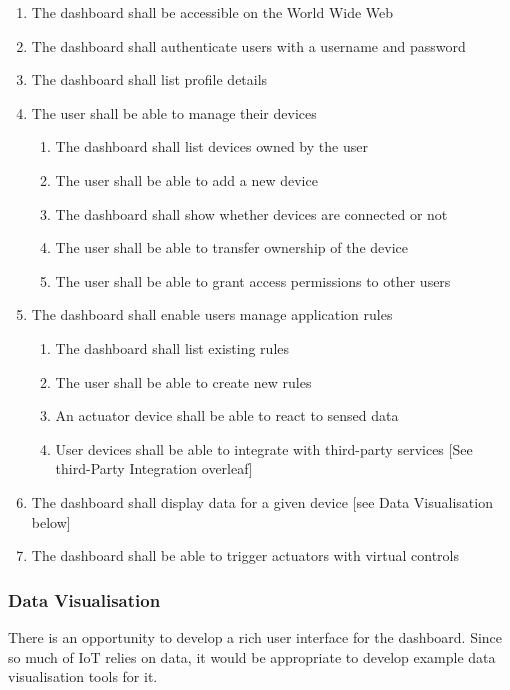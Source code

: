         \begin{enumerate}
          \item The dashboard shall be accessible on the World Wide Web
          \item The dashboard shall authenticate users with a username and password
          \item The dashboard shall list profile details
          \item The user shall be able to manage their devices
          \begin{enumerate}
            \item The dashboard shall list devices owned by the user
            \item The user shall be able to add a new device
            \item The dashboard shall show whether devices are connected or not
            \item The user shall be able to transfer ownership of the device
            \item The user shall be able to grant access permissions to other users
          \end{enumerate}
          \item The dashboard shall enable users manage application rules
          \begin{enumerate}
            \item The dashboard shall list existing rules
            \item The user shall be able to create new rules
            \item An actuator device shall be able to react to sensed data
            \item User devices shall be able to integrate with third-party services [See third-Party Integration overleaf]
          \end{enumerate}
          \item The dashboard shall display data for a given device [see Data Visualisation below]
          \item The dashboard shall be able to trigger actuators with virtual controls
        \end{enumerate}

      \subsubsection{Data Visualisation}
        There is an opportunity to develop a rich user interface for the dashboard. Since so much of IoT relies on data, it would be appropriate to develop example data visualisation tools for it.

